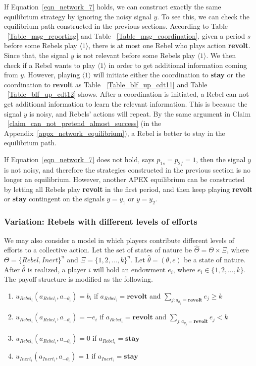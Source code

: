 \documentclass[12pt,letter]{article}
\theoremstyle{definition}
\theoremstyle{remark}
\theoremstyle{claim}
\begin{document}
If Equation~\ref{eqn_network_7} holds, we can construct exactly the same equilibrium strategy by ignoring the noisy signal $y$. To see this, we can check the equilibrium path constructed in the previous sections. According to Table ~\ref{Table_msg_reporting} and Table ~\ref{Table_msg_coordination}, given a period $s$ before some Rebels play $\langle 1 \rangle$, there is at most one Rebel who plays action \textbf{revolt}. Since that, the signal $y$ is not relevant before some Rebels play $\langle 1 \rangle$.  We then check if a Rebel wants to play $\langle 1 \rangle$ in order to get additional information coming from $y$.  However,  playing $\langle 1 \rangle$ will initiate either the coordination to \textbf{stay} or the coordination to \textbf{revolt} as Table ~\ref{Table_blf_up_cdt11} and Table ~\ref{Table_blf_up_cdt12} shows. After a coordination is initiated, a Rebel can not get additional information to learn the relevant information. This is because the signal $y$ is noisy, and Rebels' actions will repeat. By the same argument in Claim ~\ref{claim_can_not_pretend_almost_success} (in the Appendix~\ref{appx_network_equilibrium}), a Rebel is better to stay in the equilibrium path.

If Equation~\ref{eqn_network_7} does not hold, says $p_{1s}=p_{2f}=1$, then the signal $y$ is not noisy, and therefore the strategies constructed in the previous section is no longer an equilibrium. However, another APEX equilibrium can be constructed by letting all Rebels play \textbf{revolt} in the first period, and then keep playing \textbf{revolt} or \textbf{stay} contingent on the signals $y=y_1$ or $y=y_2$.

\subsubsection{Variation: Rebels with different levels of efforts}

We may also consider a model in which players contribute different levels of efforts to a collective action. Let the set of states of nature be $\hat{\Theta}=\Theta \times \Xi$, where $\Theta=\{Rebel,Inert\}^n$ and $\Xi=\{1,2,...,k\}^n$. Let $\hat{\theta}=(\theta,e)$ be a state of nature. After $\hat{\theta}$ is realized, a player $i$ will hold an endowment $e_i$, where $e_i\in \{1,2,...,k\}$. The payoff structure is modified as the following.
\begin{enumerate}
\item $u_{Rebel_i}(a_{Rebel_i},a_{-\theta_i})=b_i$ if $a_{Rebel_i}=\textbf{revolt}$ and $\sum_{j:a_{\theta_j}=\textbf{revolt}}e_j\geq k$
\item $u_{Rebel_i}(a_{Rebel_i},a_{-\theta_i})=-e_i$ if $a_{Rebel_i}=\textbf{revolt}$ and $\sum_{j:a_{\theta_j}=\textbf{revolt}}e_j< k$
\item $u_{Rebel_i}(a_{Rebel_i},a_{-\theta_i})=0$ if $a_{Rebel_i}=\textbf{stay}$
\item $u_{Inert_i}(a_{Inert_i},a_{-\theta_i})=1$ if $a_{Inert_i}=\textbf{stay}$
\end{enumerate}
\end{document}
